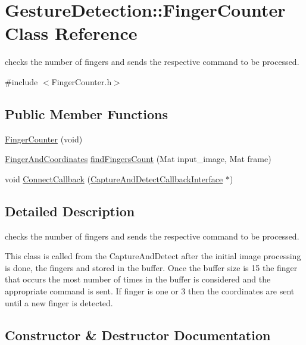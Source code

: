 \hypertarget{classGestureDetection_1_1FingerCounter}{}\section{Gesture\+Detection\+:\+:Finger\+Counter Class Reference}
\label{classGestureDetection_1_1FingerCounter}


checks the number of fingers and sends the respective command to be processed.  




{\ttfamily \#include $<$Finger\+Counter.\+h$>$}

\subsection*{Public Member Functions}
\begin{DoxyCompactItemize}
\item 
\hyperlink{classGestureDetection_1_1FingerCounter_a2f6f5bc97506e87dc7acc6e02579a916}{Finger\+Counter} (void)
\item 
\hyperlink{classGestureDetection_1_1FingerAndCoordinates}{Finger\+And\+Coordinates} \hyperlink{classGestureDetection_1_1FingerCounter_a611201352a86dd943f866c1be9507081}{find\+Fingers\+Count} (Mat input\+\_\+image, Mat frame)
\item 
void \hyperlink{classGestureDetection_1_1FingerCounter_a5b5aabaa39ff05c70a873b4c2a7869f9}{Connect\+Callback} (\hyperlink{classGestro_1_1CaptureAndDetectCallbackInterface}{Capture\+And\+Detect\+Callback\+Interface} $\ast$)
\end{DoxyCompactItemize}


\subsection{Detailed Description}
checks the number of fingers and sends the respective command to be processed. 

This class is called from the Capture\+And\+Detect after the initial image processing is done, the fingers and stored in the buffer. Once the buffer size is 15 the finger that occurs the most number of times in the buffer is considered and the appropriate command is sent. If finger is one or 3 then the coordinates are sent until a new finger is detected. 

\subsection{Constructor \& Destructor Documentation}
\mbox{\label{classGestureDetection_1_1FingerCounter_a2f6f5bc97506e87dc7acc6e02579a916}} 
